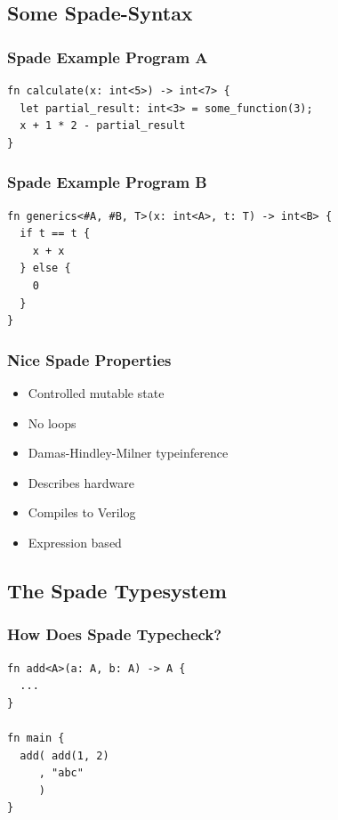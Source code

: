 \documentclass{beamer}
\begin{document}
\subsection{Some Spade-Syntax}

\begin{frame}[containsverbatim]
\frametitle{Spade Example Program A}
\large
\centering
\begin{verbatim}
fn calculate(x: int<5>) -> int<7> {
  let partial_result: int<3> = some_function(3);
  x + 1 * 2 - partial_result
}
\end{verbatim}
\end{frame}

\begin{frame}[containsverbatim]
\frametitle{Spade Example Program B}
\large
\centering
\begin{verbatim}
fn generics<#A, #B, T>(x: int<A>, t: T) -> int<B> {
  if t == t {
    x + x
  } else {
    0
  }
}
\end{verbatim}
\end{frame}

\begin{frame}[containsverbatim]
\frametitle{Nice Spade Properties}
\begin{itemize}
  \item Controlled mutable state
  \item No loops
  \item Damas-Hindley-Milner typeinference
  \item Describes hardware
  \item Compiles to Verilog
  \item Expression based
\end{itemize}
\end{frame}

\subsection{The Spade Typesystem}

\begin{frame}[containsverbatim]
\frametitle{How Does Spade Typecheck?}
\large
\centering
\begin{verbatim}
fn add<A>(a: A, b: A) -> A {
  ...
}

fn main {
  add( add(1, 2)
     , "abc"
     )
}
\end{verbatim}
\end{frame}
\end{document}
